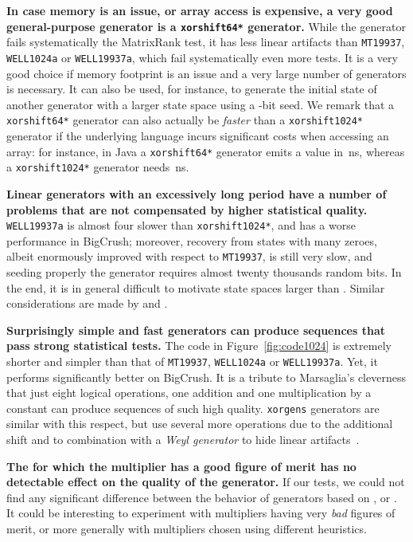 \documentclass{acmsmalltr}
\newcommand{\xorshifts}[1][]{\texttt{xorshift#1*}\xspace}
\newcommand{\wella}{\texttt{WELL1024a}\xspace}
\newcommand{\wellb}{\texttt{WELL19937a}\xspace}
\newcommand{\mt}[1][]{\texttt{MT19937}\xspace}
\newcommand{\xorgens}[1][]{\texttt{xorgens#1}\xspace}
\begin{document}
\smallskip\noindent\textbf{In case memory is an issue, or array access is
expensive, a very good general-purpose generator is a \xorshifts[64] generator.}
While the generator  fails systematically the
MatrixRank test, it has less linear artifacts than \mt, \wella or \wellb, which
fail systematically even more tests. It is a very good choice if memory footprint is an
issue and a very large number of generators is necessary. It can also be used, for instance, to
generate the initial state of another generator with a larger state space using a -bit seed.
We remark that a \xorshifts[64] generator can also actually be \emph{faster} than a
\xorshifts[1024] generator if the underlying language incurs significant
costs when accessing an array: for instance, in Java a \xorshifts[64] generator
emits a value in \,ns, whereas a \xorshifts[1024] generator needs
\,ns.

\smallskip\noindent\textbf{Linear generators with an excessively long period have a
number of problems that are not compensated by higher statistical quality.}
\wellb is almost four slower than
\xorshifts[1024], and has a worse performance in BigCrush; moreover, recovery from states
with many zeroes, albeit enormously improved with respect to \mt, is still very slow, and seeding properly
the generator requires almost twenty thousands random bits. In the end,
it is in general difficult to motivate state spaces larger than .
Similar considerations are made by  and .

\smallskip\noindent\textbf{Surprisingly simple and fast generators can produce
sequences that pass strong statistical tests.} The code in
Figure~\ref{fig:code1024} is extremely shorter and simpler than that of \mt,
\wella or \wellb. Yet, it performs significantly better on BigCrush. It is a tribute
to Marsaglia's cleverness that just eight logical operations, one addition and one multiplication by a constant can 
produce sequences of such high quality. \xorgens generators are similar with this respect,
but use several more operations due to the additional shift and to combination with a \emph{Weyl generator} to 
hide linear artifacts~\cite{BreSLPRNGUSX}.

\smallskip\noindent\textbf{The  for which the multiplier has a good figure of merit has no detectable
effect on the quality of the generator.} If our tests, we could not find any significant difference
between the behavior of generators based on ,  or . It could be interesting 
to experiment with multipliers having very \emph{bad} figures of merit, or more
generally with multipliers chosen using different heuristics.
\end{document}
